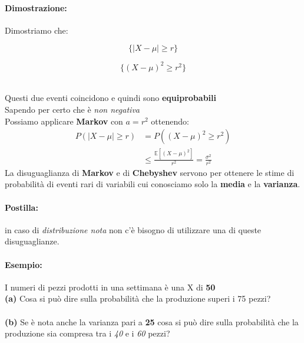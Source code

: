 \documentclass[]{article}
\newcommand{\ev}{\mathbb{E}[X]}
\renewcommand{\ev}[1]{\mathbb{E}[#1]}
\begin{document}
    \paragraph{Dimostrazione:} Dimostriamo che: \\
    \begin{minipage}{0.45\linewidth}
        \[ \{ |X - \mu | \geq r \} \]
    \end{minipage}
    \begin{minipage}{0.45\linewidth}
        \[ \{ ( X - \mu )^2 \geq r^2 \} \]
    \end{minipage} \\
    \linebreak[4]
    Questi due eventi coincidono e quindi sono \textbf{equiprobabili} \\
    Sapendo per certo che  è \textit{non negativa} \\
    Possiamo applicare \textbf{Markov} con $a = r^2$ ottenendo:
    \begin{equation*}
        \begin{split}
            P(|X - \mu | \geq r) & = P((X - \mu)^2 \geq r^2) \\
            & \leq \frac{\ev{(X - \mu)^2}}{r^2} = \frac{\sigma^2}{r^2}
        \end{split}
    \end{equation*}
    \linebreak
    La disuguaglianza di \textbf{Markov} e di \textbf{Chebyshev} servono per ottenere le stime di probabilità di eventi rari di variabili
    cui conosciamo solo la \textbf{media} e la \textbf{varianza}.

    \paragraph{Postilla:} in caso di \textit{distribuzione nota} non c'è bisogno di utilizzare una di queste disuguaglianze.

    \paragraph{Esempio:} I numeri di pezzi prodotti in una settimana è una X di \textbf{50} \\
    \textbf{(a)} Cosa si può dire sulla probabilità che la produzione superi i 75 pezzi?  \\ \\
    \textbf{(b)} Se è nota anche la varianza pari a \textbf{25} cosa si può dire sulla probabilità che la produzione sia compresa tra i \textit{40} e i \textit{60} pezzi? \\
\end{document}

